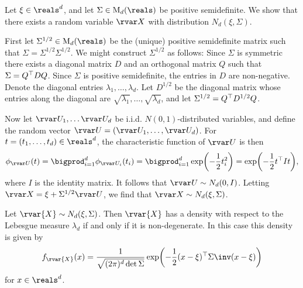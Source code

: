 \documentclass[article, a4paper, 11pt, oneside]{memoir}
\numberwithin{equation}{chapter}
\begin{document}
\begin{remark}
    \label{rem:multivariate-normal-construction}
    Let $\xi \in \reals^d$, and let $\Sigma \in \mat_d(\reals)$ be positive semidefinite. We show that there exists a random variable $\rvar X$ with distribution $N_d(\xi, \Sigma)$.

    First let $\Sigma^{1/2} \in \mat_d(\reals)$ be the (unique) positive semidefinite matrix such that $\Sigma = \Sigma^{1/2} \Sigma^{1/2}$. We might construct $\Sigma^{1/2}$ as follows: Since $\Sigma$ is symmetric there exists a diagonal matrix $D$ and an orthogonal matrix $Q$ such that $\Sigma = Q^{\top} DQ$. Since $\Sigma$ is positive semidefinite, the entries in $D$ are non-negative. Denote the diagonal entries $\lambda_1, \ldots, \lambda_d$. Let $D^{1/2}$ be the diagonal matrix whose entries along the diagonal are $\sqrt{\lambda_1}, \ldots, \sqrt{\lambda_d}$, and let $\Sigma^{1/2} = Q^{\top} D^{1/2} Q$.

    Now let $\rvar U_1, \ldots \rvar U_d$ be i.i.d. $N(0,1)$-distributed variables, and define the random vector $\rvar U = (\rvar U_1, \ldots, \rvar U_d)$. For $t = (t_1, \ldots, t_d) \in \reals^d$, the characteristic function of $\rvar U$ is then
    \begin{equation*}
        \phi_{\rvar U}(t)
            = \bigprod_{i=1}^d \phi_{\rvar U_i}(t_i)
            = \bigprod_{i=1}^d \exp \biggl( - \frac{1}{2} t_i^2 \biggr)
            = \exp \biggl( - \frac{1}{2} t\trans I t \biggr),
    \end{equation*}
    where $I$ is the identity matrix. It follows that $\rvar U \sim N_d(0, I)$. Letting $\rvar X = \xi + \Sigma^{1/2} \rvar U$, we find that $\rvar X \sim N_d(\xi, \Sigma)$.
\end{remark}


\begin{proposition}
    Let $\rvar{X} \sim N_d(\xi,\Sigma)$. Then $\rvar{X}$ has a density with respect to the Lebesgue measure $\lambda_d$ if and only if it is non-degenerate. In this case this density is given by
    \begin{equation*}
        f_{\rvar{X}}(x)
            = \frac{1}{\sqrt{ (2\pi)^d \det\Sigma }} \exp\biggl( - \frac{1}{2} (x - \xi)\trans\Sigma\inv(x - \xi) \biggr)
    \end{equation*}
    for $x \in \reals^d$.
\end{proposition}
\end{document}
